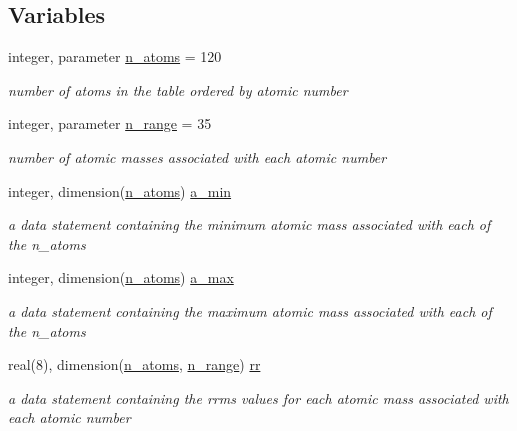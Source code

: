 \subsection*{Variables}
\begin{DoxyCompactItemize}
\item 
integer, parameter \mbox{\hyperlink{namespacenucleus__m_a97ff520812e294bf26a6b2c330f211e5}{n\+\_\+atoms}} = 120
\begin{DoxyCompactList}\small\item\em number of atoms in the table ordered by atomic number \end{DoxyCompactList}\item 
integer, parameter \mbox{\hyperlink{namespacenucleus__m_adf953c9196f6870fe5e502b4f40bea48}{n\+\_\+range}} = 35
\begin{DoxyCompactList}\small\item\em number of atomic masses associated with each atomic number \end{DoxyCompactList}\item 
integer, dimension(\mbox{\hyperlink{namespacenucleus__m_a97ff520812e294bf26a6b2c330f211e5}{n\+\_\+atoms}}) \mbox{\hyperlink{namespacenucleus__m_a8541e730d34d4c5cbb0ca885c9c5cc35}{a\+\_\+min}}
\begin{DoxyCompactList}\small\item\em a data statement containing the minimum atomic mass associated with each of the n\+\_\+atoms \end{DoxyCompactList}\item 
integer, dimension(\mbox{\hyperlink{namespacenucleus__m_a97ff520812e294bf26a6b2c330f211e5}{n\+\_\+atoms}}) \mbox{\hyperlink{namespacenucleus__m_ac8aa001386cf3938a2be5b5ec45d0c8d}{a\+\_\+max}}
\begin{DoxyCompactList}\small\item\em a data statement containing the maximum atomic mass associated with each of the n\+\_\+atoms \end{DoxyCompactList}\item 
real(8), dimension(\mbox{\hyperlink{namespacenucleus__m_a97ff520812e294bf26a6b2c330f211e5}{n\+\_\+atoms}}, \mbox{\hyperlink{namespacenucleus__m_adf953c9196f6870fe5e502b4f40bea48}{n\+\_\+range}}) \mbox{\hyperlink{namespacenucleus__m_aadb2a0e0828722e6e3f118cdf1b07f50}{rr}}
\begin{DoxyCompactList}\small\item\em a data statement containing the rrms values for each atomic mass associated with each atomic number \end{DoxyCompactList}\end{DoxyCompactItemize}


